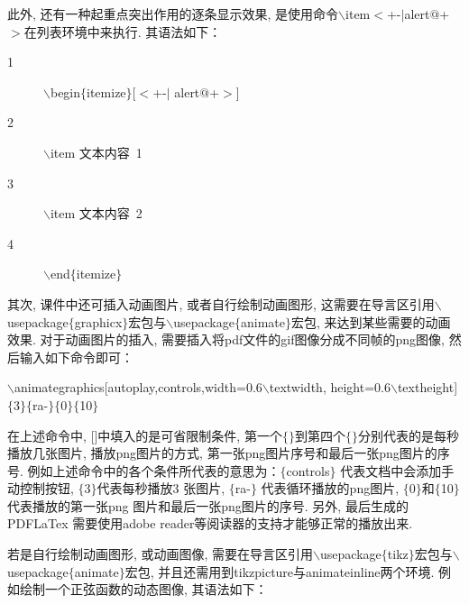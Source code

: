  此外, 还有一种起重点突出作用的逐条显示效果, 是使用命令$\backslash$item$<$+-$|$alert$@$+$>$在列表环境中来执行. 其语法如下：
    \begin{description}
        \item[1]$\backslash$begin$\{$itemize$\}$[$<$+-$|$ alert$@$+$>$]
        \item[2]$\backslash$item 文本内容~1
        \item[3]$\backslash$item 文本内容~2
        \item[4]$\backslash$end$\{$itemize$\}$
    \end{description}

其次, 课件中还可插入动画图片, 或者自行绘制动画图形, 这需要在导言区引用$\backslash$usepackage$\{$graphicx$\}$宏包与$\backslash$usepackage$\{$animate$\}$宏包, 来达到某些需要的动画效果. 对于动画图片的插入, 需要插入将pdf文件的gif图像分成不同帧的png图像, 然后输入如下命令即可：

\centerline{
$\backslash$animategraphics[autoplay,controls,width=0.6$\backslash$textwidth,
height=0.6$\backslash$textheight]$\{$3$\}\{$ra-$\}\{$0$\}\{$10$\}$}
在上述命令中, []中填入的是可省限制条件, 第一个$\{\}$到第四个$\{\}$分别代表的是每秒播放几张图片, 播放png图片的方式, 第一张png图片序号和最后一张png图片的序号. 例如上述命令中的各个条件所代表的意思为：$\{$controls$\}$ 代表文档中会添加手动控制按钮, $\{$3$\}$代表每秒播放3 张图片, $\{$ra-$\}$ 代表循环播放的png图片, $\{$0$\}$和$\{$10$\}$代表播放的第一张png 图片和最后一张png图片的序号. 另外, 最后生成的PDFLaTex 需要使用adobe reader等阅读器的支持才能够正常的播放出来.

若是自行绘制动画图形, 或动画图像, 需要在导言区引用$\backslash$usepackage$\{$tikz$\}$宏包与$\backslash$usepackage$\{$animate$\}$宏包, 并且还需用到tikzpicture与animateinline两个环境. 例如绘制一个正弦函数的动态图像, 其语法如下：


